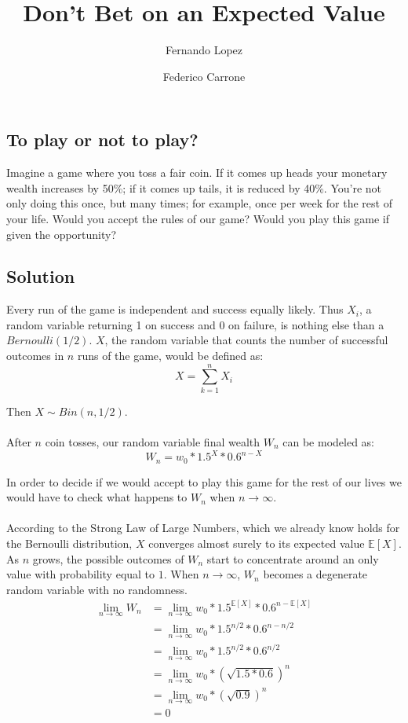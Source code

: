 \documentclass[12pt]{article}
\title{Don't Bet on an Expected Value}
\author{Fernando Lopez \and Federico Carrone}
\begin{document}
\maketitle
{}

\subsection{To play or not to play?}

Imagine a game where you toss a fair coin. If it comes up heads your monetary wealth increases by 50\%; if it comes up tails, it is reduced by 40\%. You’re not only doing this once, but many times; for example, once per week for the rest of your life. Would you accept the rules of our game? Would you play this game if given the opportunity?

\subsection{Solution}
Every run of the game is independent and success equally likely. Thus $X_i$, a random variable returning 1 on success and 0 on failure, is nothing else than a $Bernoulli(1/2)$. $X$, the random variable that counts the number of successful outcomes in $n$ runs of the game, would be defined as:
\begin{equation*}
 X = \sum\limits_{k=1}^{n} X_i
\end{equation*}

Then $X \sim Bin(n, 1/2)$.
\\\\
After $n$ coin tosses, our random variable final wealth $W_n$ can be modeled as:
\begin{equation*}
    W_n = w_0 * 1.5^X * 0.6^{n-X}
\end{equation*}

In order to decide if we would accept to play this game for the rest of our lives we would have to check what happens to $W_n$ when $n \rightarrow \infty$.
\\\\
According to the Strong Law of Large Numbers, which we already know holds for the Bernoulli distribution, $X$ converges almost surely to its expected value $\mathbb{E}[X]$. As $n$ grows, the possible outcomes of $W_n$ start to concentrate around an only value with probability equal to $1$. When $n \rightarrow \infty$, $W_n$ becomes a degenerate random variable with no randomness.
\begin{equation*}
  \begin{split}
    \lim_{n\to\infty} W_n &= \lim_{n\to\infty} w_0 * 1.5^{\mathbb{E}[X]} * 0.6^{n- \mathbb{E}[X]}\\
    & = \lim_{n\to\infty} w_0 * 1.5^{n/2} * 0.6^{n-n/2} \\
    & = \lim_{n\to\infty}w_0 * 1.5^{n/2} * 0.6^{n/2} \\
    &= \lim_{n\to\infty}w_0 * (\sqrt{1.5*0.6})^{n}\\
    &= \lim_{n\to\infty}w_0 * (\sqrt{0.9}) ^{n}\\
    &= 0
  \end{split}
\end{equation*}
\end{document}
